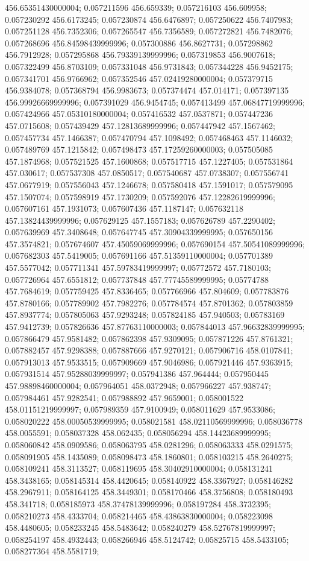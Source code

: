 456.65351430000004; 0.057211596 456.659339; 0.057216103 456.609958; 0.057230292 456.6173245; 0.057230874 456.6476897; 0.057250622 456.7407983; 0.057251128 456.7352306; 0.057265547 456.7356589; 0.057272821 456.7482076; 0.057268696 456.84598439999996; 0.057300886 456.8627731; 0.057298862 456.7912928; 0.057295868 456.79339139999996; 0.057319853 456.9007618; 0.057322499 456.8703109; 0.057331048 456.9731843; 0.057344228 456.9452175; 0.057341701 456.9766962; 0.057352546 457.02419280000004; 0.057379715 456.9384078; 0.057368794 456.9983673; 0.057374474 457.014171; 0.057397135 456.99926669999996; 0.057391029 456.9454745; 0.057413499 457.06847719999996; 0.057424966 457.05310180000004; 0.057416532 457.0537871; 0.057447236 457.0715608; 0.057439429 457.12813689999996; 0.057447942 457.1567462; 0.057457734 457.1466387; 0.057470794 457.1098492; 0.057468463 457.1146032; 0.057489769 457.1215842; 0.057498473 457.17259260000003; 0.057505085 457.1874968; 0.057521525 457.1600868; 0.057517715 457.1227405; 0.057531864 457.030617; 0.057537308 457.0850517; 0.057540687 457.0738307; 0.057556741 457.0677919; 0.057556043 457.1246678; 0.057580418 457.1591017; 0.057579095 457.1507074; 0.057598919 457.1730209; 0.057592076 457.12282619999996; 0.057607161 457.1931073; 0.057607436 457.1187147; 0.057632118 457.13824439999996; 0.057629125 457.1557183; 0.057626789 457.2290402; 0.057639969 457.3408648; 0.057647745 457.30904339999995; 0.057650156 457.3574821; 0.057674607 457.45059069999996; 0.057690154 457.50541089999996; 0.057682303 457.5419005; 0.057691166 457.51359110000004; 0.057701389 457.5577042; 0.057711341 457.59783419999997; 0.05772572 457.7180103; 0.057726964 457.6551812; 0.057737848 457.77745589999995; 0.05774788 457.7684619; 0.057759425 457.8336465; 0.057766966 457.804609; 0.057783876 457.8780166; 0.057789902 457.7982276; 0.057784574 457.8701362; 0.057803859 457.8937774; 0.057805063 457.9293248; 0.057824185 457.940503; 0.05783169 457.9412739; 0.057826636 457.87763110000003; 0.057844013 457.96632839999995; 0.057866479 457.9581482; 0.057862398 457.9309095; 0.057871226 457.8761321; 0.057882457 457.9298388; 0.057887666 457.9270121; 0.057906716 458.0107841; 0.057913013 457.9533515; 0.057909669 457.9046986; 0.057921446 457.9363915; 0.057931514 457.95288039999997; 0.057941386 457.964444; 0.057950445 457.98898460000004; 0.057964051 458.0372948; 0.057966227 457.938747; 0.057984461 457.9282541; 0.057988892 457.9659001; 0.058001522 458.01151219999997; 0.057989359 457.9100949; 0.058011629 457.9533086; 0.058020222 458.00050539999995; 0.058021581 458.02110569999996; 0.058036778 458.0055591; 0.058037328 458.062435; 0.058056294 458.14423689999995; 0.058060842 458.0909586; 0.058063795 458.0281296; 0.058063333 458.0291575; 0.058091905 458.1435089; 0.058098473 458.1860801; 0.058103215 458.2640275; 0.058109241 458.3113527; 0.058119695 458.30402910000004; 0.058131241 458.3438165; 0.058145314 458.4420645; 0.058140922 458.3367927; 0.058146282 458.2967911; 0.058164125 458.3449301; 0.058170466 458.3756808; 0.058180493 458.341718; 0.058185973 458.37478139999996; 0.058197284 458.3732395; 0.058210273 458.4333704; 0.058214465 458.43863830000004; 0.058223098 458.4480605; 0.058233245 458.5483642; 0.058240279 458.52767819999997; 0.058254197 458.4932443; 0.058266946 458.5124742; 0.05825715 458.5433105; 0.058277364 458.5581719; 